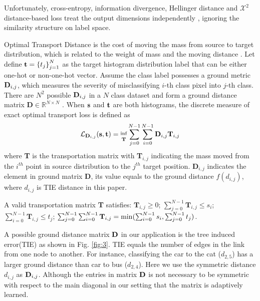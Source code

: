 \documentclass{article}
\theoremstyle{plain}%
\begin{document}
Unfortunately, cross-entropy, information divergence, Hellinger distance and $\mathcal{X}^2$ distance-based loss treat the output dimensions independently \cite{frogner2015learning}, ignoring the similarity structure on label space.  



Optimal Transport Distance is the cost of moving the mass from source to target distribution, which is related to the weight of mass and the moving distance \cite{villani2003topics}. Let define ${\rm\textbf{t}}=\left\{t_j\right\}_{j=1}^{N}$ as the target histogram distribution label that can be either one-hot or non-one-hot vector. Assume the class label possesses a ground metric ${\rm\textbf{D}}_{i,j}$, which measures the severity of misclassifying $i$-th class pixel into $j$-th class. There are $N^2$ possible ${\rm\textbf{D}}_{i,j}$ in a $N$ class dataset and form a ground distance matrix $\textbf{D}\in\mathbb{R}^{N\times N}$ \cite{ruschendorf1985wasserstein}. When ${\rm\textbf{s}}$ and ${\rm\textbf{t}}$ are both histograms, the discrete measure of exact optimal transport loss is defined as \begin{equation}
\mathcal{L}_{\textbf{D}_{i,j}}({\rm{\textbf{s},\textbf{t}}})=\mathop{}_{\textbf{T}}^{{\rm inf}}\sum_{j=0}^{N-1}\sum_{i=0}^{N-1}\textbf{D}_{i,j}\textbf{T}_{i,j} \label{con:df}
\end{equation} where \textbf{T} is the transportation matrix with \textbf{T}$_{i,j}$ indicating the mass moved from the $i^{th}$ point in source distribution to the $j^{th}$ target position. $\mathbf{D}_{i,j}$ indicates the element in ground matrix $\mathbf{D}$, its value equals to the ground distance $f(d_{i,j})$, where $d_{i,j}$ is TIE distance in this paper. 

A valid transportation matrix \textbf{T} satisfies: $ \textbf{T}_{i,j}\geq 0$; $\sum_{j=0}^{N-1} \textbf{T}_{i,j}\leq s_i$; $\sum_{i=0}^{N-1} \textbf{T}_{i,j}\leq t_j$; $\sum_{j=0}^{N-1}\sum_{i=0}^{N-1} \textbf{T}_{i,j}={\rm min}(\sum_{i=0}^{N-1}s_i,\sum_{j=0}^{N-1}t_j)$. 

A possible ground distance matrix ${\rm\textbf{D}}$ in our application is the tree induced error(TIE) as shown in Fig. \ref{fig:3}. TIE equals the number of edges in the link from one node to another. For instance, classifying the car to the cat ($d_{2,5}$) has a larger ground distance than car to bus ($d_{2,4}$). Here we use the symmetric distance $d_{i,j}$ as ${\rm\textbf{D}}_{i,j}$. Although the entries in matrix ${\rm\textbf{D}}$ is not necessary to be symmetric with respect to the main diagonal in our setting that the matrix is adaptively learned.
\end{document}
